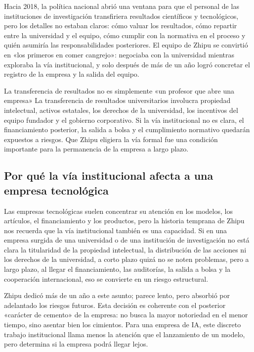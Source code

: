 \documentclass[a4paper]{article}
\begin{document}
Hacia 2018, la política nacional abrió una ventana para que el personal de las instituciones de investigación transfiriera resultados científicos y tecnológicos, pero los detalles no estaban claros: cómo valuar los resultados, cómo repartir entre la universidad y el equipo, cómo cumplir con la normativa en el proceso y quién asumiría las responsabilidades posteriores. El equipo de Zhipu se convirtió en «los primeros en comer cangrejo»: negociaba con la universidad mientras exploraba la vía institucional, y solo después de más de un año logró concretar el registro de la empresa y la salida del equipo.

\begin{warningbox}{La transferencia de resultados no es simplemente «un profesor que abre una empresa»}
La transferencia de resultados universitarios involucra propiedad intelectual, activos estatales, los derechos de la universidad, los incentivos del equipo fundador y el gobierno corporativo. Si la vía institucional no es clara, el financiamiento posterior, la salida a bolsa y el cumplimiento normativo quedarán expuestos a riesgos. Que Zhipu eligiera la vía formal fue una condición importante para la permanencia de la empresa a largo plazo.
\end{warningbox}

\subsection{Por qué la vía institucional afecta a una empresa tecnológica}

Las empresas tecnológicas suelen concentrar su atención en los modelos, los artículos, el financiamiento y los productos, pero la historia temprana de Zhipu nos recuerda que la vía institucional también es una capacidad. Si en una empresa surgida de una universidad o de una institución de investigación no está clara la titularidad de la propiedad intelectual, la distribución de las acciones ni los derechos de la universidad, a corto plazo quizá no se noten problemas, pero a largo plazo, al llegar el financiamiento, las auditorías, la salida a bolsa y la cooperación internacional, eso se convierte en un riesgo estructural.

Zhipu dedicó más de un año a este asunto; parece lento, pero absorbió por adelantado los riesgos futuros. Esta decisión es coherente con el posterior «carácter de cemento» de la empresa: no busca la mayor notoriedad en el menor tiempo, sino asentar bien los cimientos. Para una empresa de IA, este discreto trabajo institucional llama menos la atención que el lanzamiento de un modelo, pero determina si la empresa podrá llegar lejos.
\end{document}
